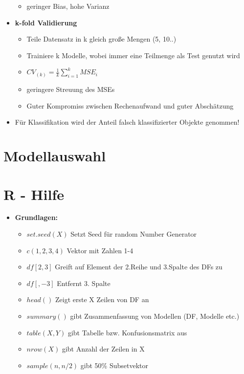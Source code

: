 \documentclass[a4paper]{article}
\begin{document}
\begin{landscape}
\begin{multicols}{3}
\begin{itemize}[noitemsep,nolistsep,leftmargin=*]
\begin{itemize}[noitemsep,nolistsep,leftmargin=*]
                \item geringer Bias, hohe Varianz
            \end{itemize}
            \item \textbf{k-fold Validierung}
            \begin{itemize}[noitemsep,nolistsep,leftmargin=*]
                \item Teile Datensatz in k gleich große Mengen (5, 10..)
                \item Trainiere k Modelle, wobei immer eine Teilmenge als Test genutzt wird
                \item $CV_{(k)} = \frac{1}{k}\sum_{i=1}^k MSE_i$
                \item geringere Streuung des MSEs
                \item Guter Kompromiss zwischen Rechenaufwand und guter Abschätzung
            \end{itemize}
            \item Für Klassifikation wird der Anteil falsch klassifizierter Objekte genommen!
        \end{itemize}



        \section{Modellauswahl}



        \section{R - Hilfe}
        \begin{itemize} [noitemsep,nolistsep,leftmargin=*]
            \item \textbf{Grundlagen:}
            \begin{itemize}[noitemsep,nolistsep,leftmargin=*]
                \item $set.seed(X)$ Setzt Seed für random Number Generator
                \item $c(1,2,3,4)$ Vektor mit Zahlen 1-4
                \item $df[2,3]$ Greift auf Element der 2.Reihe und 3.Spalte des DFs zu
                \item $df[,-3]$ Entfernt 3. Spalte
                \item $head()$ Zeigt erste X Zeilen von DF an
                \item $summary()$ gibt Zusammenfassung von Modellen (DF, Modelle etc.)
                \item $table(X,Y)$ gibt Tabelle bzw. Konfusionsmatrix aus
                \item $nrow(X)$ gibt Anzahl der Zeilen in X
                \item $sample(n, n/2)$ gibt 50\% Subsetvektor
            \end{itemize}


\end{itemize}
\end{multicols}
\end{landscape}
\end{document}
